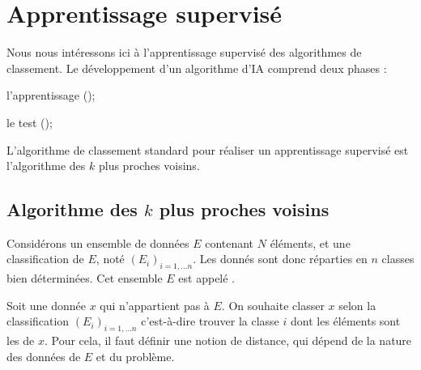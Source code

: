 \documentclass[12pt,fancy]{cours}
\begin{document}

\section{Apprentissage supervisé}

Nous nous intéressons ici à l'apprentissage supervisé des algorithmes de classement. Le développement d'un algorithme d'IA comprend deux phases :
\begin{liste}
    \item l'apprentissage ();
    \item le test ();
\end{liste} 
L'algorithme de classement standard pour réaliser un apprentissage supervisé  est l'algorithme des $k$ plus proches voisins.


\subsection{Algorithme des $k$ plus proches voisins}
\label{sec:kvoisins}

 Considérons un ensemble de données $E$ contenant $N$ éléments, et une classification de $E$, noté $(E_i)_{i=1,...n}$. Les donnés sont donc réparties en $n$ classes bien déterminées. Cet ensemble $E$ est appelé .

Soit une donnée $x$ qui n'appartient pas à $E$. On souhaite classer $x$ selon la classification $(E_i)_{i=1,...n}$ c'est-à-dire trouver la classe $i$ dont les éléments sont les  de $x$. Pour cela, il faut définir une notion de distance, qui dépend de la nature des données de $E$ et du problème.
\end{document}
